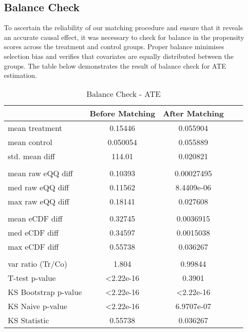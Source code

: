 \documentclass{article}[12pt]
\begin{document}
\subsection{Balance Check}
To ascertain the reliability of our matching procedure and ensure that it reveals an accurate causal effect, it was necessary to check for balance in the propensity scores across the treatment and control groups. Proper balance minimises selection bias and verifies that covariates are equally distributed between the groups. The table below demonstrates the result of balance check for ATE estimation. \par
\begin{table}[htbp]
    \centering
    \caption{Balance Check - ATE}
    \label{tab: Balance Check - ATE}
    \begin{tabular}{lcccc}
        \toprule
         & \textbf{Before Matching} & \textbf{After Matching}  \\ 
        \midrule
         mean treatment & 0.15446 & 0.055904  \\
         mean control & 0.050054 & 0.055889  \\
         std. mean diff & 114.01 & 0.020821 \\
         \\
         mean raw eQQ diff & 0.10393 & 0.00027495 \\
         med raw eQQ diff & 0.11562 & 8.4409e-06 \\
         max raw eQQ diff & 0.18141 & 0.027608 \\
         \\
         mean eCDF diff & 0.32745 & 0.0036915  \\
         med eCDF diff & 0.34597 & 0.0015038 \\
         max eCDF diff & 0.55738 & 0.036267 \\
         \\
         var ratio (Tr/Co) & 1.804 & 0.99844 \\
         T-test p-value & \textless 2.22e-16 & 0.3901 \\
         KS Bootstrap p-value & \textless 2.22e-16 & \textless 2.22e-16 \\
         KS Naive p-value & \textless 2.22e-16 & 6.9707e-07 \\
         KS Statistic & 0.55738 & 0.036267 \\        
        \bottomrule
    \end{tabular}
\end{table}
\end{document}

